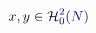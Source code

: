 \documentclass[12pt]{article}
\begin{document}
\makeatletter
\renewcommand*{\@textcolor}[3]{%
  \protect\leavevmode
  \begingroup
    \color#1{#2}#3%
  \endgroup
}
\makeatother
\begin{displaymath}
\mathcolor[RGB]{0,0,15}{x} \mathcolor[RGB]{0,0,30}{,} \mathcolor[RGB]{0,0,45}{y} \mathcolor[RGB]{0,0,60}{\in} \mathcal { \mathcolor[RGB]{0,0,75}{H} } _ { \mathcolor[RGB]{0,0,90}{0} } ^ { \mathcolor[RGB]{0,0,105}{2} } \mathcolor[RGB]{0,0,120}{(} \mathcolor[RGB]{0,0,135}{N} \mathcolor[RGB]{0,0,150}{)}
\end{displaymath}
\end{document}

